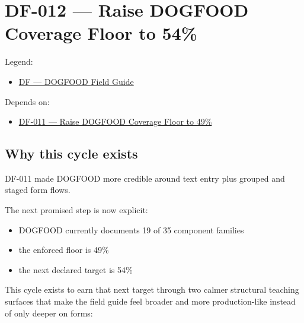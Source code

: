 \chapter{DF-012 --- Raise DOGFOOD Coverage Floor to 54\%}\label{record-074}

\smallskip

Legend:

\begin{itemize}
\tightlist
\item
  \href{https://github.com/flyingrobots/bijou/blob/1853ad902f6bf219326409e7f743a5a1d6517dbc/docs/legends/DF-dogfood-field-guide.md}{DF --- DOGFOOD Field Guide}
\end{itemize}

Depends on:

\begin{itemize}
\tightlist
\item
  \href{https://github.com/flyingrobots/bijou/blob/cbd70612140e7a450d764b3c7be1c6af878b99bc/docs/design/DF-011-raise-dogfood-coverage-floor-to-49-percent.md}{DF-011 --- Raise DOGFOOD Coverage Floor to 49\%}
\end{itemize}

\section{Why this cycle exists}\label{record-074-why-this-cycle-exists}

DF-011 made DOGFOOD more credible around text entry plus grouped and staged form flows.

The next promised step is now explicit:

\begin{itemize}
\tightlist
\item
  DOGFOOD currently documents 19 of 35 component families
\item
  the enforced floor is 49\%
\item
  the next declared target is 54\%
\end{itemize}

This cycle exists to earn that next target through two calmer structural teaching surfaces that make the field guide feel broader and more production-like instead of only deeper on forms:

